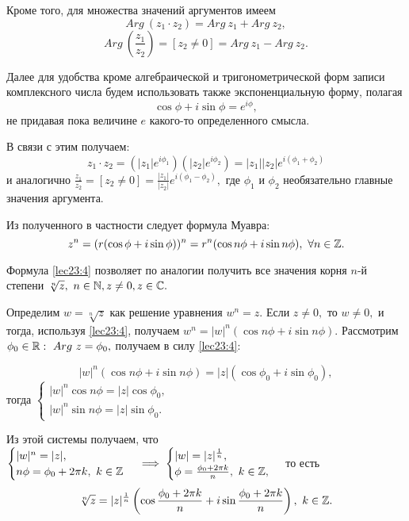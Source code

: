 \documentclass[../../main.tex]{subfiles}
\begin{document}
	Кроме того, для множества значений аргументов имеем 
	\[Arg\ (z_1\cdot z_2) = Arg\ z_1 + Arg\ z_2,\]
	\[Arg\ \left(\frac{z_1}{z_2}\right) =[z_2 \neq 0] = Arg\ z_1 - Arg\ z_2.\]
	
	Далее для удобства кроме алгебраической и тригонометрической форм записи
	комплексного числа будем использовать также экспоненциальную форму,
	полагая \[\cos \phi + i \sin\phi = e^{i\phi},\] не придавая пока
	величине $e$ какого-то определенного смысла.
	
	В связи с этим получаем:
	\[z_1\cdot z_2 = \left(|z_1| e^{i{\phi}_1}\right)
	\left(|z_2| e^{i{\phi}_2}\right) = |z_1||z_2| e^{i({\phi}_1+{\phi}_2)} \]
	и аналогично $\frac{z_1}{z_2} =  [z_2 \neq 0] = \frac{|z_1|}{|z_2|} 
	e^{i({\phi}_1-{\phi}_2)},$ где ${\phi}_1$ и ${\phi}_2$ необязательно 
	главные значения аргумента.
	
	Из полученного в частности следует формула Муавра:
	\begin{equation}
	\label{lec23:4}
	z^n = (r(\cos \phi + i\sin \phi))^n = r^n(\cos n\phi + i\sin n\phi),\
    \forall n\in \mathbb{Z}.
	\end{equation}
	
	Формула \eqref{lec23:4} позволяет по аналогии получить все значения корня
	$n$-й степени $\sqrt[n]{z},\ n\in\mathbb{N}, z\neq 0, z\in \mathbb{C}.$
	
	Определим $w = \sqrt[n]{z}$  как решение уравнения $w^n = z.$ Если 
	$z\neq 0,$ то $w\neq 0,$ и тогда, используя \eqref{lec23:4}, получаем
	$w^n = |w|^n(\cos n\phi + i\sin n\phi).$ Рассмотрим ${\phi}_0\in\mathbb{R}:\
	Arg\ z = {\phi}_0,$ получаем в силу  \eqref{lec23:4}:
	
	\begin{equation}
	\label{lec23:5}
	|w|^n (\cos n\phi + i\sin n\phi) = |z| (\cos {\phi}_0 + i\sin {\phi}_0),
	\end{equation}
	тогда $\begin{cases} 
	|w|^n \cos n\phi =  |z| \cos {\phi}_0,\\
	|w|^n \sin n\phi  = |z| \sin {\phi}_0.
	\end{cases}$
	
	Из этой системы получаем, что 
	$\begin{cases} 
	|w|^n =  |z|,\\
	n\phi  = {\phi}_0 + 2\pi k,\ k\in\mathbb{Z}
	\end{cases} \implies 
	\begin{cases} 
	|w| =  |z|^{\frac{1}{n}},\\
	\phi  = \frac{{\phi}_0 + 2\pi k}{n},\ k\in\mathbb{Z},
	\end{cases}$ то есть \begin{equation}
	\label{lec23:6}
	\sqrt[n]{z} = |z|^{\frac{1}{n}}\left(\cos\frac{{\phi}_0 + 2\pi k}{n}
	 + i\sin \frac{{\phi}_0 + 2\pi k}{n} \right),\ k\in\mathbb{Z}.
	\end{equation}
	
\end{document}
